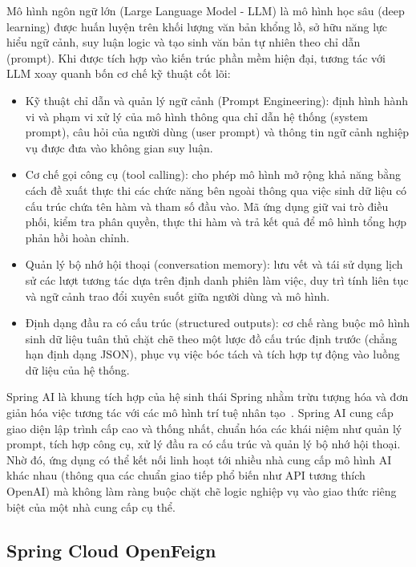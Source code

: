 \documentclass[../BTL.tex]{subfiles}
\begin{document}
Mô hình ngôn ngữ lớn (Large Language Model - LLM) là mô hình học sâu (deep learning) được huấn luyện trên khối lượng văn bản khổng lồ, sở hữu năng lực hiểu ngữ cảnh, suy luận logic và tạo sinh văn bản tự nhiên theo chỉ dẫn (prompt). Khi được tích hợp vào kiến trúc phần mềm hiện đại, tương tác với LLM xoay quanh bốn cơ chế kỹ thuật cốt lõi:
\begin{itemize}
    \item Kỹ thuật chỉ dẫn và quản lý ngữ cảnh (Prompt Engineering): định hình hành vi và phạm vi xử lý của mô hình thông qua chỉ dẫn hệ thống (system prompt), câu hỏi của người dùng (user prompt) và thông tin ngữ cảnh nghiệp vụ được đưa vào không gian suy luận.
    \item Cơ chế gọi công cụ (tool calling): cho phép mô hình mở rộng khả năng bằng cách đề xuất thực thi các chức năng bên ngoài thông qua việc sinh dữ liệu có cấu trúc chứa tên hàm và tham số đầu vào. Mã ứng dụng giữ vai trò điều phối, kiểm tra phân quyền, thực thi hàm và trả kết quả để mô hình tổng hợp phản hồi hoàn chỉnh.
    \item Quản lý bộ nhớ hội thoại (conversation memory): lưu vết và tái sử dụng lịch sử các lượt tương tác dựa trên định danh phiên làm việc, duy trì tính liên tục và ngữ cảnh trao đổi xuyên suốt giữa người dùng và mô hình.
    \item Định dạng đầu ra có cấu trúc (structured outputs): cơ chế ràng buộc mô hình sinh dữ liệu tuân thủ chặt chẽ theo một lược đồ cấu trúc định trước (chẳng hạn định dạng JSON), phục vụ việc bóc tách và tích hợp tự động vào luồng dữ liệu của hệ thống.
\end{itemize}

Spring AI là khung tích hợp của hệ sinh thái Spring nhằm trừu tượng hóa và đơn giản hóa việc tương tác với các mô hình trí tuệ nhân tạo~\cite{springaidocs}. Spring AI cung cấp giao diện lập trình cấp cao và thống nhất, chuẩn hóa các khái niệm như quản lý prompt, tích hợp công cụ, xử lý đầu ra có cấu trúc và quản lý bộ nhớ hội thoại. Nhờ đó, ứng dụng có thể kết nối linh hoạt tới nhiều nhà cung cấp mô hình AI khác nhau (thông qua các chuẩn giao tiếp phổ biến như API tương thích OpenAI) mà không làm ràng buộc chặt chẽ logic nghiệp vụ vào giao thức riêng biệt của một nhà cung cấp cụ thể.

\subsection{Spring Cloud OpenFeign}
\label{section:1.3.4}
\end{document}

